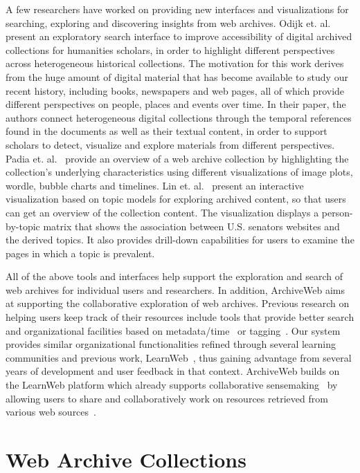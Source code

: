 \documentclass{llncs}
\begin{document}
A few researchers have worked on providing new interfaces and
visualizations for searching, exploring and discovering insights from
web archives. Odijk et. al.~\cite{odijk15} present an exploratory
search interface to improve accessibility of digital archived
collections for humanities scholars, in order to highlight different
perspectives across heterogeneous historical collections. The
motivation for this work derives from the huge amount of digital
material that has become available to study our recent history,
including books, newspapers and web pages, all of which provide
different perspectives on people, places and events over time. In
their paper, the authors connect heterogeneous digital collections
through the temporal references found in the documents as well as
their textual content, in order to support scholars to detect,
visualize and explore materials from different perspectives. Padia
et. al.~\cite{padia12} provide an overview of a web archive
collection by highlighting the collection's underlying characteristics
using different visualizations of image plots, wordle, bubble charts
and timelines. Lin et. al.~\cite{lin14} present an interactive visualization based on topic models for exploring archived content,
so that users can get an overview of the collection content. The visualization displays a person-by-topic matrix that shows the association between U.S. senators websites and the derived topics. It also provides drill-down capabilities for users to examine the pages in which a topic is prevalent.

All of the above tools and interfaces help support the
exploration and search of web archives for individual users and
researchers. In addition, ArchiveWeb aims at
supporting the collaborative exploration of web archives. 
Previous
research on helping users keep track of their resources include tools
that provide better search and organizational facilities based on
metadata/time~\cite{dumais03} or tagging~\cite{cutrell06}. Our system provides similar organizational functionalities refined through several
learning communities and previous work, LearnWeb~\cite{tlt12}, thus gaining advantage from several years
of development and user feedback in that context. ArchiveWeb builds on the LearnWeb platform which already supports
collaborative sensemaking~\cite{Evans08,Russell93} by allowing users to share and
collaboratively work on resources retrieved from various web sources~\cite{Amershi08,Held2009,Morris2008,Morris2007}. 

\section{Web Archive Collections}\label{sec:Web Archive Collections}
\end{document}

